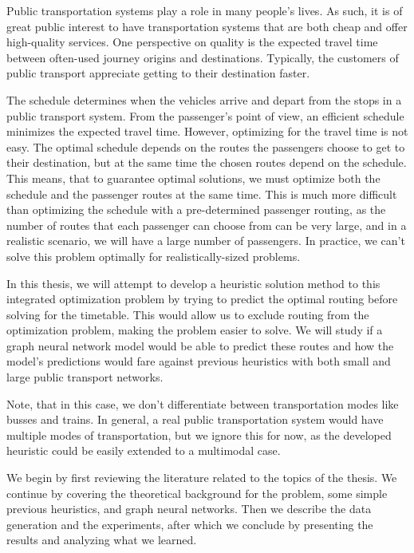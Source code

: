 \documentclass[english, 12pt, a4paper, sci, utf8, a-2b, online]{aaltothesis}
\begin{document}
Public transportation systems play a role in many people's lives. As such, it is of great public interest to have transportation systems that are both cheap and offer high-quality services. One perspective on quality is the expected travel time between often-used journey origins and destinations. Typically, the customers of public transport appreciate getting to their destination faster. 




The schedule determines when the vehicles arrive and depart from the stops in a public transport system. From the passenger's point of view, an efficient schedule minimizes the expected travel time. However, optimizing for the travel time is not easy. The optimal schedule depends on the routes the passengers choose to get to their destination, but at the same time the chosen routes depend on the schedule. This means, that to guarantee optimal solutions, we must optimize both the schedule and the passenger routes at the same time. This is much more difficult than optimizing the schedule with a pre-determined passenger routing, as the number of routes that each passenger can choose from can be very large, and in a realistic scenario, we will have a large number of passengers. In practice, we can't solve this problem optimally for realistically-sized problems.

In this thesis, we will attempt to develop a heuristic solution method to this integrated optimization problem by trying to predict the optimal routing before solving for the timetable. This would allow us to exclude routing from the optimization problem, making the problem easier to solve. We will study if a graph neural network model would be able to predict these routes and how the model's predictions would fare against previous heuristics with both small and large public transport networks.

Note, that in this case, we don't differentiate between transportation modes
like busses and trains. In general, a real public transportation system would have multiple modes of transportation, but we ignore this for now, as the developed heuristic could be easily extended to a multimodal case. 

We begin by first reviewing the literature related to the topics of the thesis. We continue by covering the theoretical background for the problem, some simple previous heuristics, and graph neural networks. Then we describe the data generation and the experiments, after which we conclude by presenting the results and analyzing what we learned.
\end{document}

